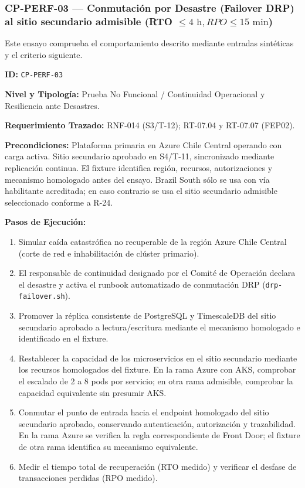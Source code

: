 \subsubsection*{CP-PERF-03 — Conmutación por Desastre (Failover DRP) al sitio secundario admisible (RTO $\le 4\text{ h}, RPO \le 15\text{ min}$)}\label{sec:9-cp-perf-03}
Este ensayo comprueba el comportamiento descrito mediante entradas sintéticas y el criterio siguiente.

\par\noindent \textbf{ID:} \texttt{CP-\allowbreak{}PERF-\allowbreak{}03}\par
\par\noindent \textbf{Nivel y Tipología:} Prueba No Funcional / Continuidad Operacional y Resiliencia ante Desastres.\par
\par\noindent \textbf{Requerimiento Trazado:} RNF-014 (S3/T-12); RT-07.04 y RT-07.07 (FEP02).\par
\par\noindent \textbf{Precondiciones:} Plataforma primaria en Azure Chile Central operando con carga activa. Sitio secundario aprobado en S4/T-11, sincronizado mediante replicación continua. El fixture identifica región, recursos, autorizaciones y mecanismo homologado antes del ensayo. Brazil South sólo se usa con vía habilitante acreditada; en caso contrario se usa el sitio secundario admisible seleccionado conforme a R-24.\par
\par\noindent \textbf{Pasos de Ejecución:}\par
\begin{enumerate}
\item Simular caída catastrófica no recuperable de la región Azure Chile Central (corte de red e inhabilitación de clúster primario).
\item El responsable de continuidad designado por el Comité de Operación declara el desastre y activa el runbook automatizado de conmutación DRP (\texttt{drp-\allowbreak{}failover.sh}).
\item Promover la réplica consistente de PostgreSQL y TimescaleDB del sitio secundario aprobado a lectura/escritura mediante el mecanismo homologado e identificado en el fixture.
\item Restablecer la capacidad de los microservicios en el sitio secundario mediante los recursos homologados del fixture. En la rama Azure con AKS, comprobar el escalado de 2 a 8 pods por servicio; en otra rama admisible, comprobar la capacidad equivalente sin presumir AKS.
\item Conmutar el punto de entrada hacia el endpoint homologado del sitio secundario aprobado, conservando autenticación, autorización y trazabilidad. En la rama Azure se verifica la regla correspondiente de Front Door; el fixture de otra rama identifica su mecanismo equivalente.
\item Medir el tiempo total de recuperación (RTO medido) y verificar el desfase de transacciones perdidas (RPO medido).
\end{enumerate}

